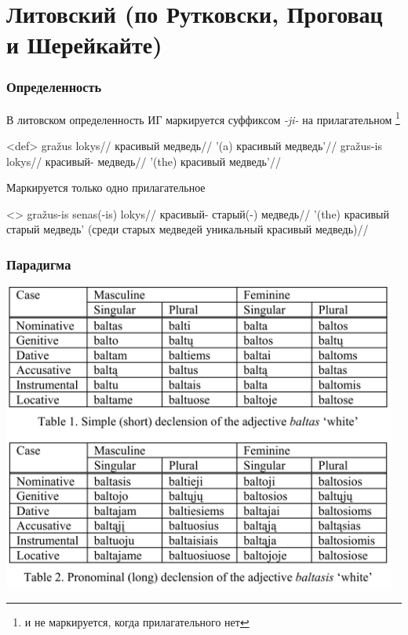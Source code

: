 \documentclass[9pt, t]{beamer}
\begin{document}
\section{Литовский (по Рутковски, Проговац и Шерейкайте)}
\begin{frame}
    \frametitle{Определенность}
    
    В литовском определенность ИГ маркируется суффиксом \textit{-ji-} на прилагательном \citep{sereikaite2017}\footnote{и не маркируется, когда прилагательного нет}

    \pex<def>
        \a \begingl
            \gla gražus lokys//
            \glb красивый медведь//
            \glft '(a) красивый медведь'//
        \endgl
        \a \begingl
            \gla gražus-is lokys//
            \glb красивый-\Def{} медведь//
            \glft '(the) красивый медведь'//
        \endgl
    \xe

    \pause
    
    Маркируется только одно прилагательное

    \ex<>
        \begingl
            \gla gražus-is senas(-is) lokys//
            \glb красивый-\Def{} старый(-\Def) медведь//
            \glft '(the) красивый старый медведь' (среди старых медведей уникальный красивый медведь)//
        \endgl
    \xe
\end{frame}

\begin{frame}
    \frametitle{Парадигма \citep{rutpro2006}}

    \includegraphics[width=35em]{lit paradigm.png}

\end{frame}
\end{document}
